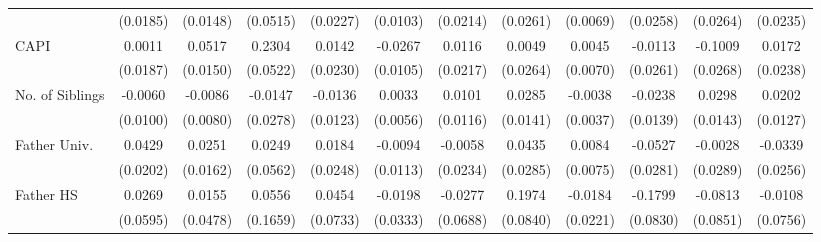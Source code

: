\begin{table}[htbp]
\begin{tabular}{l*{11}{c}}
            &    (0.0185)         &    (0.0148)         &    (0.0515)         &    (0.0227)         &    (0.0103)         &    (0.0214)         &    (0.0261)         &    (0.0069)         &    (0.0258)         &    (0.0264)         &    (0.0235)         \\
\addlinespace
CAPI        &      0.0011         &      0.0517\sym{***}&      0.2304\sym{***}&      0.0142         &     -0.0267\sym{*}  &      0.0116         &      0.0049         &      0.0045         &     -0.0113         &     -0.1009\sym{***}&      0.0172         \\
            &    (0.0187)         &    (0.0150)         &    (0.0522)         &    (0.0230)         &    (0.0105)         &    (0.0217)         &    (0.0264)         &    (0.0070)         &    (0.0261)         &    (0.0268)         &    (0.0238)         \\
\addlinespace
No. of Siblings&     -0.0060         &     -0.0086         &     -0.0147         &     -0.0136         &      0.0033         &      0.0101         &      0.0285\sym{*}  &     -0.0038         &     -0.0238         &      0.0298\sym{*}  &      0.0202         \\
            &    (0.0100)         &    (0.0080)         &    (0.0278)         &    (0.0123)         &    (0.0056)         &    (0.0116)         &    (0.0141)         &    (0.0037)         &    (0.0139)         &    (0.0143)         &    (0.0127)         \\
\addlinespace
Father Univ.&      0.0429\sym{*}  &      0.0251         &      0.0249         &      0.0184         &     -0.0094         &     -0.0058         &      0.0435         &      0.0084         &     -0.0527         &     -0.0028         &     -0.0339         \\
            &    (0.0202)         &    (0.0162)         &    (0.0562)         &    (0.0248)         &    (0.0113)         &    (0.0234)         &    (0.0285)         &    (0.0075)         &    (0.0281)         &    (0.0289)         &    (0.0256)         \\
\addlinespace
Father HS   &      0.0269         &      0.0155         &      0.0556         &      0.0454         &     -0.0198         &     -0.0277         &      0.1974\sym{*}  &     -0.0184         &     -0.1799\sym{*}  &     -0.0813         &     -0.0108         \\
            &    (0.0595)         &    (0.0478)         &    (0.1659)         &    (0.0733)         &    (0.0333)         &    (0.0688)         &    (0.0840)         &    (0.0221)         &    (0.0830)         &    (0.0851)         &    (0.0756)         \\

\end{tabular}
\end{table}
